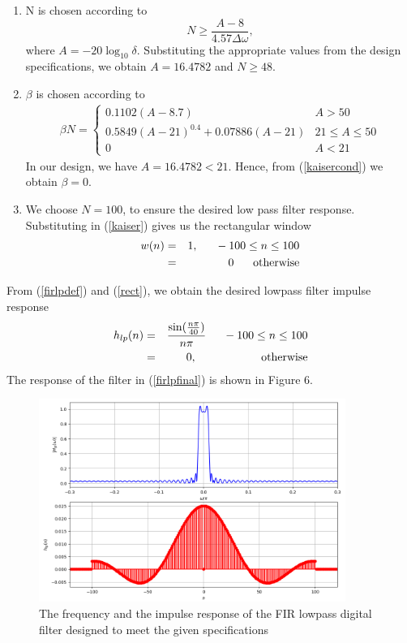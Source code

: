 \documentclass[journal,12pt,twocolumn]{IEEEtran}
\theoremstyle{remark}
\begin{document}
\begin{enumerate}
\item  N is chosen according to
\begin{equation}
N \geq \frac{A-8}{4.57\Delta \omega},
\end{equation}
where $A = -20\log_{10}\delta$.  Substituting the appropriate values from the design specifications, we obtain
$A = 16.4782$ and $N \geq 48$.
\\
\item  $\beta$ is chosen according to
{\tiny\begin{eqnarray}
\label{kaisercond}
\beta N = \left\{ \begin{array}{ll} 0.1102(A-8.7) & A > 50 \\
0.5849(A-21)^{0.4}+ 0.07886(A-21) & 21 \leq A \leq 50 \\
0 & A < 21\end{array} \right.
\end{eqnarray}}
In our design, we have $A = 16.4782 < 21$.  Hence, from (\ref{kaisercond}) we obtain $\beta = 0$.  
\\
\item We choose $N = 100$, to ensure the desired low pass filter response.  Substituting in (\ref{kaiser})
gives us the rectangular window
\begin{eqnarray}
\label{rect}
w(n) &=& 1, \indent -100 \leq n \leq 100 \nonumber \\
&=& 0 \hspace{6mm} \mbox{otherwise}
\end{eqnarray}
\end{enumerate}

From (\ref{firlpdef}) and (\ref{rect}), we obtain the desired lowpass filter impulse response
\begin{eqnarray}
\label{firlpfinal}
h_{lp}(n) &=& \frac{\sin(\frac{n\pi}{40})}{n\pi} \indent -100 \leq n \leq 100 \nonumber \\
&=& 0, \hspace{2cm} \mbox{otherwise}
\end{eqnarray}
The response of the filter in (\ref{firlpfinal}) is shown in Figure 6.

\begin{figure}
\label{fig5}
\includegraphics[width = 10cm]{figs/figure5.png}
\caption{The frequency and the impulse response of the FIR lowpass digital filter designed to meet the given specifications} 
\end{figure}
\end{document}
